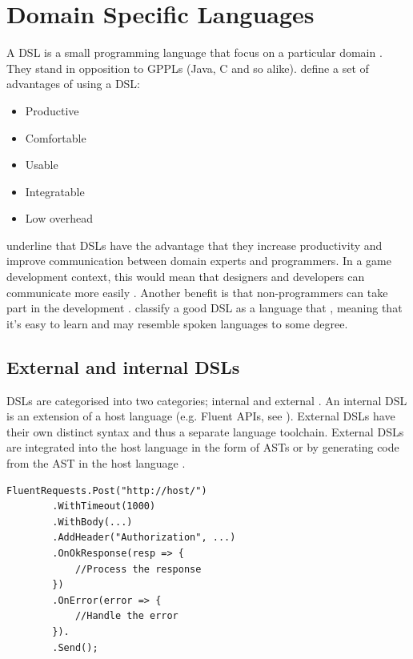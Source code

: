 \section{Domain Specific Languages}
A \ac{DSL} is a small programming language that focus on a particular domain \cite{fowler2010domain}. They stand in opposition to \acp{GPPL} (Java, C and so alike). \cite{beyak2011saga} define a set of advantages of using a \ac{DSL}:
\begin{itemize}
    \item Productive
    \item Comfortable
    \item Usable
    \item Integratable
    \item Low overhead
\end{itemize}
\cite{fowler2010domain} underline that \acp{DSL} have the advantage that they increase productivity and improve communication between domain experts and programmers. In a game development context, this would mean that designers and developers can communicate more easily \cite{Walter:2011:IDL:2071423.2071475}. Another benefit is that non-programmers can take part in the development \cite{beyak2011saga,Walter:2011:IDL:2071423.2071475}. 
\cite{Walter:2011:IDL:2071423.2071475} classify a good \ac{DSL} as a language that , meaning that it's easy to learn and may resemble spoken languages to some degree.

\subsection{External and internal DSLs}
\acp{DSL} are categorised into two categories; internal and external \cite{fowler2010domain}. An internal \ac{DSL} is an extension of a host language (e.g. Fluent \acp{API}, see ). External \acp{DSL} have their own distinct syntax and thus a separate language toolchain. External \acp{DSL} are integrated into the host language in the form of \acp{AST} or by generating code from the \ac{AST} in the host language \cite{fowler2010domain}.

\begin{lstlisting}[language={CSharp}, caption={Example of a Fluent \ac{API} to build a web request. Inspired by \cite{apache:fluent}}, label=lst:request:fluent]
FluentRequests.Post("http://host/")
        .WithTimeout(1000)
        .WithBody(...)
        .AddHeader("Authorization", ...)
        .OnOkResponse(resp => {
            //Process the response
        })
        .OnError(error => {
            //Handle the error
        }).
        .Send();
\end{lstlisting}

